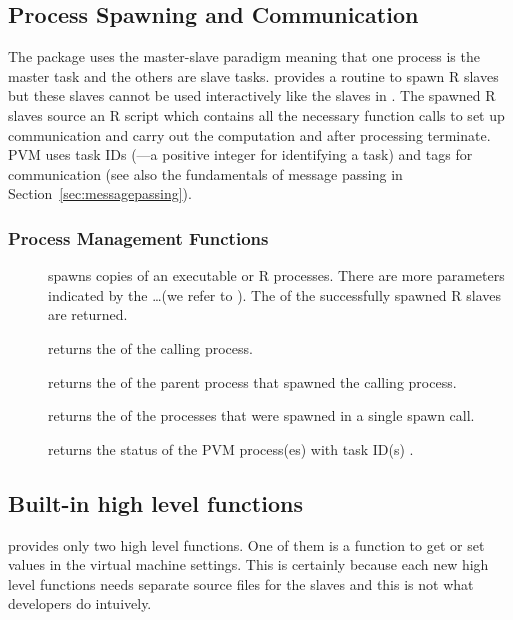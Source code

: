 \subsection{Process Spawning and Communication}

The package  uses the master-slave paradigm meaning that one
process is the master task and the others are slave tasks. 
provides a routine to spawn R slaves but these slaves cannot be used
interactively like the slaves in . The spawned R slaves
source an R script which contains all the necessary function calls to
set up communication and carry out the computation and after
processing terminate.
PVM uses task IDs (---a positive integer for identifying a task)
and tags for communication (see
also the fundamentals of message passing in
Section~\ref{sec:messagepassing}).

\subsubsection{Process Management  Functions}
\begin{description}
\item[] spawns 
  copies 
  of an executable or  R processes. There are more
  parameters indicated by the \ldots (we refer to
  \cite{nali07rpvm}). The  of the successfully spawned R
  slaves are returned.
\item[] returns the  of the calling
  process.
\item[] returns the  of the parent
  process that spawned the calling process.
\item[] returns the  of the processes
  that were spawned in a single spawn call.
\item[] returns the status of the PVM
  process(es) with task ID(s) .
\end{description}

\subsection{Built-in high level functions}

 provides only two high level functions. One of them is a
function to get or set values in the virtual machine settings. This is
certainly because each new high level functions needs separate source
files for the slaves and this is not what developers do intuively. 

